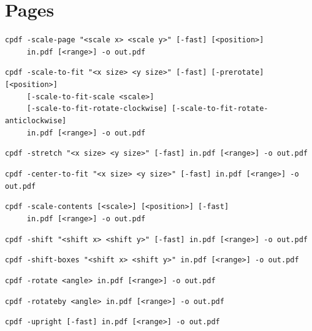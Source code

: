 \documentclass{book}
\begin{document}
\chapter{Pages}\label{chap:3}
\pagestyle{fancy}
  \label{pages}
  \begin{framed}
  \small\noindent\verb!cpdf -scale-page "<scale x> <scale y>" [-fast] [<position>]!\\
        \noindent\verb!     in.pdf [<range>] -o out.pdf!
   
  \vspace{1.5mm}
  \small\noindent\verb!cpdf -scale-to-fit "<x size> <y size>" [-fast] [-prerotate] [<position>]!\\
        \noindent\verb!     [-scale-to-fit-scale <scale>]!\\
        \noindent\verb!     [-scale-to-fit-rotate-clockwise] [-scale-to-fit-rotate-anticlockwise]!\\
        \noindent\verb!     in.pdf [<range>] -o out.pdf!

  \vspace{1.5mm}
  \small\noindent\verb!cpdf -stretch "<x size> <y size>" [-fast] in.pdf [<range>] -o out.pdf!

  \vspace{1.5mm}
  \small\noindent\verb!cpdf -center-to-fit "<x size> <y size>" [-fast] in.pdf [<range>] -o out.pdf!

  \vspace{1.5mm}
  \small\noindent\verb!cpdf -scale-contents [<scale>] [<position>] [-fast]!\\
        \noindent\verb!     in.pdf [<range>] -o out.pdf!
  
  \vspace{1.5mm}
  \small\noindent\verb!cpdf -shift "<shift x> <shift y>" [-fast] in.pdf [<range>] -o out.pdf!

  \vspace{1.5mm}
  \small\noindent\verb!cpdf -shift-boxes "<shift x> <shift y>" in.pdf [<range>] -o out.pdf!

  \vspace{1.5mm}
  \small\noindent\verb!cpdf -rotate <angle> in.pdf [<range>] -o out.pdf!

  \vspace{1.5mm}
  \small\noindent\verb!cpdf -rotateby <angle> in.pdf [<range>] -o out.pdf!

  \vspace{1.5mm}
  \small\noindent\verb!cpdf -upright [-fast] in.pdf [<range>] -o out.pdf!


\end{framed}
\end{document}
